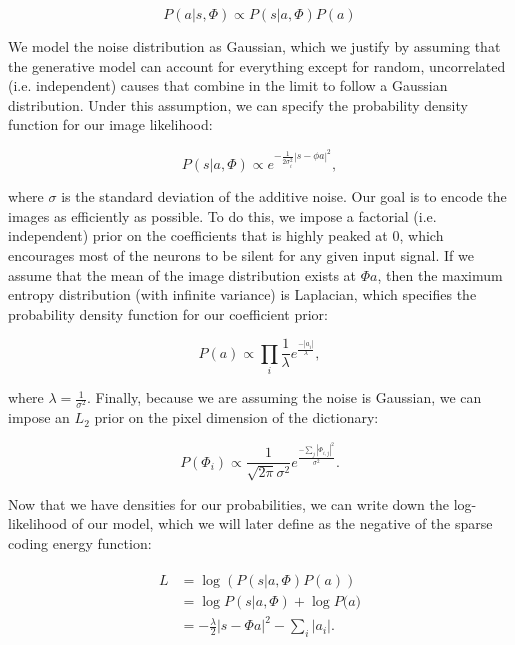 \begin{equation}\label{eq:ch2_bayes}
    P(a|s,\Phi) \propto P(s|a,\Phi) P(a)
\end{equation}

We model the noise distribution as Gaussian, which we justify by assuming that the generative model can account for everything except for random, uncorrelated (i.e. independent) causes that combine in the limit to follow a Gaussian distribution. Under this assumption, we can specify the probability density function for our image likelihood:

\begin{equation}\label{eq:ch2_image_likelihood}
    P(s|a,\Phi) \propto e^{-\frac{1}{2\sigma_{i}^{2}}|s-\phi a|^{2}},
\end{equation}

\noindent where $\sigma$ is the standard deviation of the additive noise. Our goal is to encode the images as efficiently as possible. To do this, we impose a factorial (i.e. independent) prior on the coefficients that is highly peaked at 0, which encourages most of the neurons to be silent for any given input signal. If we assume that the mean of the image distribution exists at $\Phi a$, then the maximum entropy distribution (with infinite variance) is Laplacian, which specifies the probability density function for our coefficient prior:

\begin{equation}\label{eq:ch2_coefficient_prior}
    P(a) \propto \prod_{i}\frac{1}{\lambda} e^{\frac{-|a_{i}|}{\lambda}},
\end{equation}

\noindent where $\lambda = \tfrac{1}{\sigma^{2}}$. Finally, because we are assuming the noise is Gaussian, we can impose an $L_{2}$ prior on the pixel dimension of the dictionary:

\begin{equation}\label{eq:ch2_dictionary_prior}
    P(\Phi_{i}) \propto \frac{1}{\sqrt{2\pi}\sigma^{2}}e^{\frac{-\sum_{j}|\Phi_{i,j}|^{2}}{\sigma^{2}}}.
\end{equation}

Now that we have densities for our probabilities, we can write down the log-likelihood of our model, which we will later define as the negative of the sparse coding energy function:

\begin{align}\label{eq:ch2_log_likelihood}
\begin{split}
    L &= \log\left(P(s|a,\Phi)P(a)\right) \\
      &= \log{P(s|a,\Phi)} + \log{P(a}) \\
      &= -\frac{\lambda}{2}|s - \Phi a|^{2} - \sum_{i}|a_{i}|.
\end{split}
\end{align}

